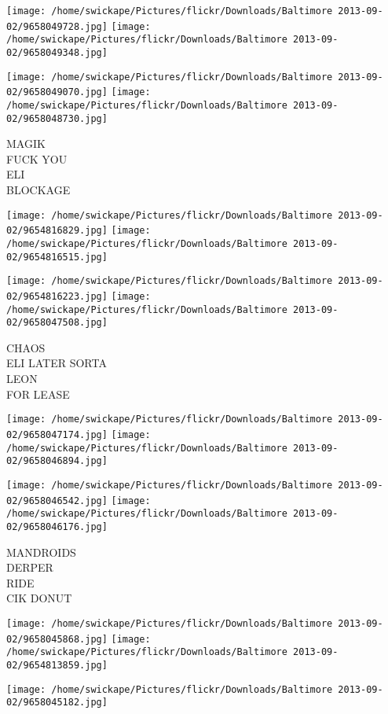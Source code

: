\documentclass[10pt,letterpaper]{article}
\begin{document}
\texttt{[image: /home/swickape/Pictures/flickr/Downloads/Baltimore 2013-09-02/9658049728.jpg]}
\texttt{[image: /home/swickape/Pictures/flickr/Downloads/Baltimore 2013-09-02/9658049348.jpg]}

\texttt{[image: /home/swickape/Pictures/flickr/Downloads/Baltimore 2013-09-02/9658049070.jpg]}
\texttt{[image: /home/swickape/Pictures/flickr/Downloads/Baltimore 2013-09-02/9658048730.jpg]}

MAGIK\\
FUCK YOU\\
ELI\\
BLOCKAGE\\
\pagebreak

\texttt{[image: /home/swickape/Pictures/flickr/Downloads/Baltimore 2013-09-02/9654816829.jpg]}
\texttt{[image: /home/swickape/Pictures/flickr/Downloads/Baltimore 2013-09-02/9654816515.jpg]}

\texttt{[image: /home/swickape/Pictures/flickr/Downloads/Baltimore 2013-09-02/9654816223.jpg]}
\texttt{[image: /home/swickape/Pictures/flickr/Downloads/Baltimore 2013-09-02/9658047508.jpg]}

CHAOS\\
ELI LATER SORTA\\
LEON\\
FOR LEASE\\
\pagebreak

\texttt{[image: /home/swickape/Pictures/flickr/Downloads/Baltimore 2013-09-02/9658047174.jpg]}
\texttt{[image: /home/swickape/Pictures/flickr/Downloads/Baltimore 2013-09-02/9658046894.jpg]}

\texttt{[image: /home/swickape/Pictures/flickr/Downloads/Baltimore 2013-09-02/9658046542.jpg]}
\texttt{[image: /home/swickape/Pictures/flickr/Downloads/Baltimore 2013-09-02/9658046176.jpg]}

MANDROIDS\\
DERPER\\
RIDE\\
CIK DONUT\\
\pagebreak

\texttt{[image: /home/swickape/Pictures/flickr/Downloads/Baltimore 2013-09-02/9658045868.jpg]}
\texttt{[image: /home/swickape/Pictures/flickr/Downloads/Baltimore 2013-09-02/9654813859.jpg]}

\texttt{[image: /home/swickape/Pictures/flickr/Downloads/Baltimore 2013-09-02/9658045182.jpg]}
\end{document}

